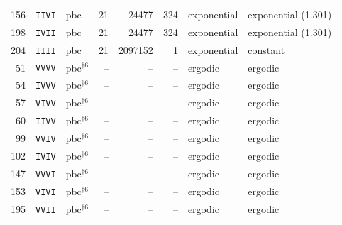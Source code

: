 \begin{tabular}{@{}rl l r rr l l@{}}
156 & \texttt{IIVI} & pbc & 21 & 24477 & 324 & exponential & exponential (1.301) \\
198 & \texttt{IVII} & pbc & 21 & 24477 & 324 & exponential & exponential (1.301) \\
204 & \texttt{IIII} & pbc & 21 & 2097152 & 1 & exponential & constant \\
51 & \texttt{VVVV} & pbc$^{\dagger6}$ & -- & -- & -- & ergodic & ergodic \\
54 & \texttt{IVVV} & pbc$^{\dagger6}$ & -- & -- & -- & ergodic & ergodic \\
57 & \texttt{VIVV} & pbc$^{\dagger6}$ & -- & -- & -- & ergodic & ergodic \\
60 & \texttt{IIVV} & pbc$^{\dagger6}$ & -- & -- & -- & ergodic & ergodic \\
99 & \texttt{VVIV} & pbc$^{\dagger6}$ & -- & -- & -- & ergodic & ergodic \\
102 & \texttt{IVIV} & pbc$^{\dagger6}$ & -- & -- & -- & ergodic & ergodic \\
147 & \texttt{VVVI} & pbc$^{\dagger6}$ & -- & -- & -- & ergodic & ergodic \\
153 & \texttt{VIVI} & pbc$^{\dagger6}$ & -- & -- & -- & ergodic & ergodic \\
195 & \texttt{VVII} & pbc$^{\dagger6}$ & -- & -- & -- & ergodic & ergodic \\
\bottomrule
\end{tabular}
